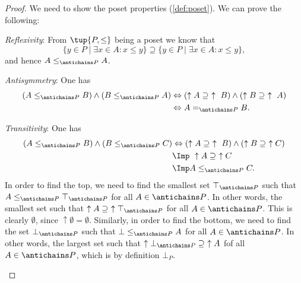 \begin{proof}
We need to show the poset properties (\cref{def:poset}).
We can prove the following:
\begin{compactitem}
\item \emph{Reflexivity}: From $\tup{P,\leq}$ being a poset we know that 
\begin{equation}
\{y\in P \mid \exists x\in A \colon x\leq y\} \supseteq \{y\in P \mid \exists x\in A \colon x\leq y\},
\end{equation}
and hence $A\leq_{\antichains P}A$.
\item \emph{Antisymmetry}: One has
\begin{equation}
    \begin{aligned}
    \left(A\leq_{\antichains P} B\right) \wedge \left(B\leq_{\antichains P} A\right)
    &\Leftrightarrow \left(\uparrow A \supseteq \ \uparrow \ B\right) \wedge \left( \uparrow  B\supseteq \ \uparrow \ A\right)\\
    &\Leftrightarrow A=_{\antichains P} B.
    \end{aligned}
\end{equation}
\item \emph{Transitivity}: One has
\begin{equation}
    \begin{aligned}
    \left(A\leq_{\antichains P} B\right) \wedge \left(B\leq_{\antichains P} C\right)&\Leftrightarrow  \left(\uparrow A \supseteq \ \uparrow \ B\right) \wedge \left( \uparrow  B\supseteq \ \uparrow C\right)\\
    &\Imp \ \uparrow A\supseteq \ \uparrow C\\
    &\Imp A\leq_{\antichains P}C.
    \end{aligned}
\end{equation}
In order to find the top, we need to find the smallest set $\top_{\antichains P}$ such that $A\leq_{\antichains P} \top_{\antichains P} $ for all $A\in \antichains P$. In other words, the smallest set such that $\uparrow A\supseteq \ \uparrow \top_{\antichains P}$ for all $A\in \antichains P$. This is clearly $\emptyset$, since $\uparrow \emptyset = \emptyset$. Similarly, in order to find the bottom, we need to find the set $\bot_{\antichains P}$ such that $\bot\leq_{\antichains P} A$ for all $A\in \antichains P$. In other words, the largest set such that $\uparrow \bot_{\antichains P} \supseteq \ \uparrow A$ fof all $A\in \antichains P$, which is by definition $\bot_P$. 
\end{compactitem}
\end{proof}